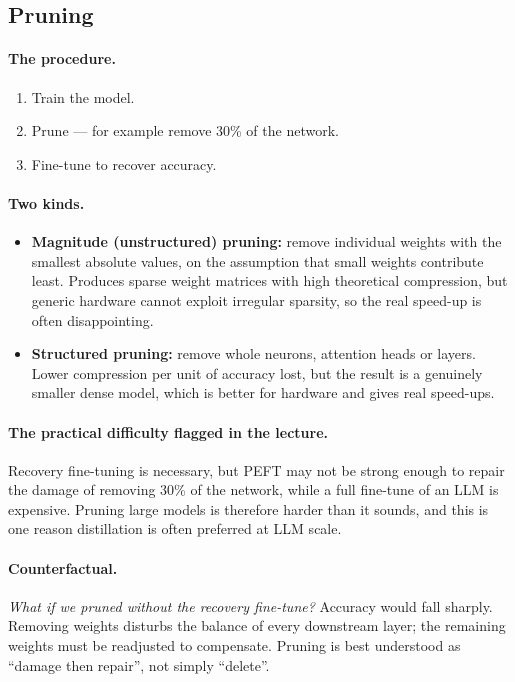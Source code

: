 \documentclass[11pt,a4paper]{article}
\begin{document}
\subsection{Pruning}

\paragraph{The procedure.}
\begin{enumerate}
\item Train the model.
\item Prune --- for example remove 30\% of the network.
\item Fine-tune to recover accuracy.
\end{enumerate}

\paragraph{Two kinds.}
\begin{itemize}
\item \textbf{Magnitude (unstructured) pruning:} remove individual weights with the smallest
  absolute values, on the assumption that small weights contribute least. Produces sparse
  weight matrices with high theoretical compression, but generic hardware cannot exploit
  irregular sparsity, so the real speed-up is often disappointing.
\item \textbf{Structured pruning:} remove whole neurons, attention heads or layers. Lower
  compression per unit of accuracy lost, but the result is a genuinely smaller dense model,
  which is better for hardware and gives real speed-ups.
\end{itemize}

\paragraph{The practical difficulty flagged in the lecture.} Recovery fine-tuning is
necessary, but PEFT may not be strong enough to repair the damage of removing 30\% of the
network, while a full fine-tune of an LLM is expensive. Pruning large models is therefore
harder than it sounds, and this is one reason distillation is often preferred at LLM scale.

\paragraph{Counterfactual.} \emph{What if we pruned without the recovery fine-tune?} Accuracy
would fall sharply. Removing weights disturbs the balance of every downstream layer; the
remaining weights must be readjusted to compensate. Pruning is best understood as
``damage then repair'', not simply ``delete''.
\end{document}
